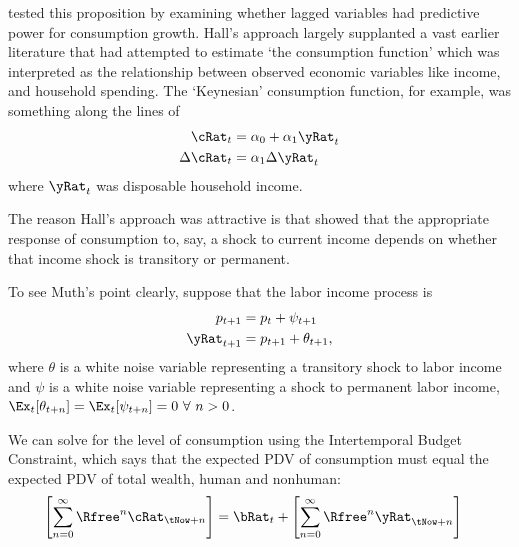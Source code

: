 \documentclass{handout}
\begin{document}
\cite{hallRandomWalk} tested this proposition by examining whether lagged variables
had predictive power for consumption growth.  Hall's approach largely supplanted a 
vast earlier literature that had attempted to estimate `the consumption function' 
which was interpreted as the relationship between observed economic variables like income, and 
household spending.  The `Keynesian' consumption function, for example, was something 
along the lines of 
\begin{equation}\begin{gathered}\begin{aligned}
    \cRat_{t} & =  \alpha_{0} + \alpha_{1} \yRat_{t} \label{eq:KeynesianC}
\\ \Delta  \cRat_{t} & =  \alpha_{1} \Delta \yRat_{t}
\end{aligned}\end{gathered}\end{equation}
where $\yRat_{t}$ was disposable household income.

The reason Hall's approach was attractive is that \cite{muthOptimal}
showed that the appropriate response of consumption to, say, a shock
to current income depends on whether that income shock is transitory
or permanent.  

To see Muth's point clearly, suppose that the labor income process is 
\begin{equation}\begin{gathered}\begin{aligned}
        p_{t+1} & =  p_{t}+\psi_{t+1}
\\      \yRat_{t+1} & =  p_{t+1}+\theta_{t+1},
\end{aligned}\end{gathered}\end{equation}
where $\theta$ is a white noise variable representing a transitory 
shock to labor income and $\psi$ is a white noise variable 
representing a shock to permanent labor income, $\Ex_{t}[\theta_{t+n}]= 
\Ex_{t}[\psi_{t+n}]= 0~\forall~n>0$.  

We can solve for the level of consumption using the Intertemporal
Budget Constraint, which says that the expected PDV of consumption
must equal the expected PDV of total wealth, human and nonhuman:
\begin{equation}\begin{gathered}\begin{aligned}
        \left[\sum_{n=0}^{\infty} \Rfree^{n} \cRat_{\tNow+n}\right] & =  \bRat_{t} + \left[\sum_{n=0}^{\infty} \Rfree^{n}\yRat_{\tNow+n}\right]
\end{aligned}\end{gathered}\end{equation}
\end{document}
